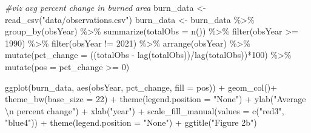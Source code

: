 \documentclass[
]{article}
\newenvironment{Shaded}{\begin{snugshade}}{\end{snugshade}}
\newcommand{\AttributeTok}[1]{\textcolor[rgb]{0.77,0.63,0.00}{#1}}
\newcommand{\CommentTok}[1]{\textcolor[rgb]{0.56,0.35,0.01}{\textit{#1}}}
\newcommand{\DecValTok}[1]{\textcolor[rgb]{0.00,0.00,0.81}{#1}}
\newcommand{\FunctionTok}[1]{\textcolor[rgb]{0.00,0.00,0.00}{#1}}
\newcommand{\NormalTok}[1]{#1}
\newcommand{\OtherTok}[1]{\textcolor[rgb]{0.56,0.35,0.01}{#1}}
\newcommand{\SpecialCharTok}[1]{\textcolor[rgb]{0.00,0.00,0.00}{#1}}
\newcommand{\StringTok}[1]{\textcolor[rgb]{0.31,0.60,0.02}{#1}}
\begin{document}
\begin{Shaded}
\begin{Highlighting}[]
\CommentTok{\#viz avg percent change in burned area}
\NormalTok{burn\_data }\OtherTok{\textless{}{-}} \FunctionTok{read\_csv}\NormalTok{(}\StringTok{"data/observations.csv"}\NormalTok{)}
\NormalTok{burn\_data }\OtherTok{\textless{}{-}}\NormalTok{ burn\_data }\SpecialCharTok{\%\textgreater{}\%}
  \FunctionTok{group\_by}\NormalTok{(obsYear) }\SpecialCharTok{\%\textgreater{}\%} 
  \FunctionTok{summarize}\NormalTok{(}\AttributeTok{totalObs =} \FunctionTok{n}\NormalTok{()) }\SpecialCharTok{\%\textgreater{}\%} 
  \FunctionTok{filter}\NormalTok{(obsYear }\SpecialCharTok{\textgreater{}=} \DecValTok{1990}\NormalTok{) }\SpecialCharTok{\%\textgreater{}\%} 
  \FunctionTok{filter}\NormalTok{(obsYear }\SpecialCharTok{!=} \DecValTok{2021}\NormalTok{) }\SpecialCharTok{\%\textgreater{}\%} 
  \FunctionTok{arrange}\NormalTok{(obsYear) }\SpecialCharTok{\%\textgreater{}\%} 
  \FunctionTok{mutate}\NormalTok{(}\AttributeTok{pct\_change =}\NormalTok{ ((totalObs }\SpecialCharTok{{-}} \FunctionTok{lag}\NormalTok{(totalObs))}\SpecialCharTok{/}\FunctionTok{lag}\NormalTok{(totalObs))}\SpecialCharTok{*}\DecValTok{100}\NormalTok{) }\SpecialCharTok{\%\textgreater{}\%} 
  \FunctionTok{mutate}\NormalTok{(}\AttributeTok{pos =}\NormalTok{ pct\_change }\SpecialCharTok{\textgreater{}=} \DecValTok{0}\NormalTok{)}
  
\FunctionTok{ggplot}\NormalTok{(burn\_data, }\FunctionTok{aes}\NormalTok{(obsYear, pct\_change, }\AttributeTok{fill =}\NormalTok{ pos)) }\SpecialCharTok{+}
  \FunctionTok{geom\_col}\NormalTok{()}\SpecialCharTok{+} \FunctionTok{theme\_bw}\NormalTok{(}\AttributeTok{base\_size =} \DecValTok{22}\NormalTok{) }\SpecialCharTok{+}
  \FunctionTok{theme}\NormalTok{(}\AttributeTok{legend.position =} \StringTok{"None"}\NormalTok{) }\SpecialCharTok{+}
  \FunctionTok{ylab}\NormalTok{(}\StringTok{"Average }\SpecialCharTok{\textbackslash{}n}\StringTok{ percent change"}\NormalTok{) }\SpecialCharTok{+}
  \FunctionTok{xlab}\NormalTok{(}\StringTok{"year"}\NormalTok{) }\SpecialCharTok{+}
  \FunctionTok{scale\_fill\_manual}\NormalTok{(}\AttributeTok{values =} \FunctionTok{c}\NormalTok{(}\StringTok{"red3"}\NormalTok{, }\StringTok{"blue4"}\NormalTok{)) }\SpecialCharTok{+}
  \FunctionTok{theme}\NormalTok{(}\AttributeTok{legend.position =} \StringTok{"None"}\NormalTok{) }\SpecialCharTok{+} \FunctionTok{ggtitle}\NormalTok{(}\StringTok{"Figure 2b"}\NormalTok{)}
\end{Highlighting}
\end{Shaded}
\end{document}
